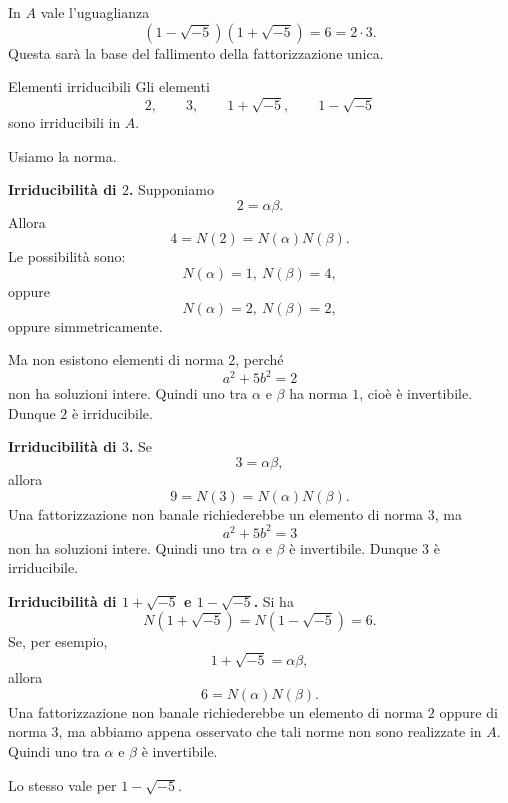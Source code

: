\documentclass[a4paper]{article}
\begin{document}
\begin{radioactive}
In \(A\) vale l'uguaglianza
\[
    (1-\sqrt{-5})(1+\sqrt{-5})=6=2\cdot 3.
\]
Questa sarà la base del fallimento della fattorizzazione unica.
\end{radioactive}

\begin{radioactive}
\begin{snippetproposition}{Elementi irriducibili}
    Gli elementi
    \[
        2,
        \qquad
        3,
        \qquad
        1+\sqrt{-5},
        \qquad
        1-\sqrt{-5}
    \]
    sono irriducibili in \(A\).
\end{snippetproposition}
\end{radioactive}

\begin{radioactive}
\begin{snippetproof}{}
    Usiamo la norma.

    \textbf{Irriducibilità di \(2\).}
    Supponiamo
    \[
        2=\alpha\beta.
    \]
    Allora
    \[
        4=N(2)=N(\alpha)N(\beta).
    \]
    Le possibilità sono:
    \[
        N(\alpha)=1,\ N(\beta)=4,
    \]
    oppure
    \[
        N(\alpha)=2,\ N(\beta)=2,
    \]
    oppure simmetricamente.

    Ma non esistono elementi di norma \(2\), perché
    \[
        a^2+5b^2=2
    \]
    non ha soluzioni intere. Quindi uno tra \(\alpha\) e \(\beta\) ha norma \(1\), cioè è invertibile.
    Dunque \(2\) è irriducibile.

    \textbf{Irriducibilità di \(3\).}
    Se
    \[
        3=\alpha\beta,
    \]
    allora
    \[
        9=N(3)=N(\alpha)N(\beta).
    \]
    Una fattorizzazione non banale richiederebbe un elemento di norma \(3\), ma
    \[
        a^2+5b^2=3
    \]
    non ha soluzioni intere. Quindi uno tra \(\alpha\) e \(\beta\) è invertibile.
    Dunque \(3\) è irriducibile.

    \textbf{Irriducibilità di \(1+\sqrt{-5}\) e \(1-\sqrt{-5}\).}
    Si ha
    \[
        N(1+\sqrt{-5})=N(1-\sqrt{-5})=6.
    \]
    Se, per esempio,
    \[
        1+\sqrt{-5}=\alpha\beta,
    \]
    allora
    \[
        6=N(\alpha)N(\beta).
    \]
    Una fattorizzazione non banale richiederebbe un elemento di norma \(2\) oppure di norma \(3\), ma abbiamo appena osservato che tali norme non sono realizzate in \(A\).
    Quindi uno tra \(\alpha\) e \(\beta\) è invertibile.

    Lo stesso vale per \(1-\sqrt{-5}\).
\end{snippetproof}
\end{radioactive}
\end{document}
